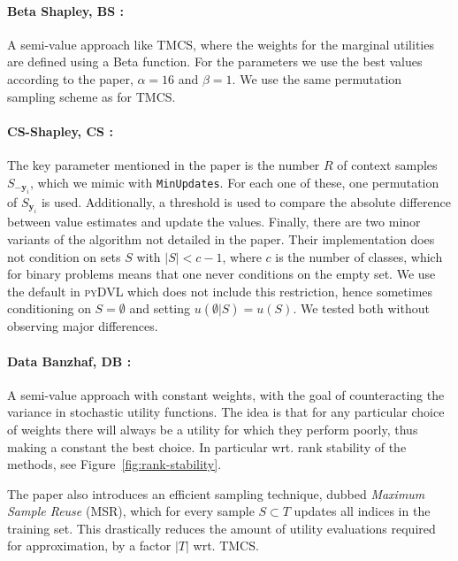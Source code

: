 \documentclass[10pt]{article}
\newcommand{\tmem}[1]{{\em #1\/}}
\newcommand{\tmmathbf}[1]{\ensuremath{\boldsymbol{#1}}}
\newcommand{\tmname}[1]{\textsc{#1}}
\newcommand{\python}[1]{\texttt{#1}}
\begin{document}
\paragraph{Beta Shapley, BS {\citep{kwon_beta_2022}}:}A semi-value approach
like TMCS, where the weights for the marginal utilities are defined using a
Beta function. For the parameters we use the best values according to the
paper, $\alpha = 16$ and $\beta = 1$. We use the same permutation sampling
scheme as for TMCS.

\paragraph{CS-Shapley, CS {\citep{schoch_csshapley_2022}}:}The key parameter
mentioned in the paper is the number $R$ of context samples
$S_{-\tmmathbf{y}_i}$, which we mimic with {\small{{\python{MinUpdates}}}}.
For each one of these, one permutation of $S_{\tmmathbf{y}_i}$ is used.
Additionally, a threshold is used to compare the absolute difference between
value estimates and update the values. Finally, there are two minor variants
of the algorithm not detailed in the paper. Their implementation does not
condition on sets $S$ with $| S | < c - 1$, where $c$ is the number of
classes, which for binary problems means that one never conditions on the
empty set. We use the default in {\tmname{pyDVL}} which does not include this
restriction, hence sometimes conditioning on $S = \emptyset$ and setting $u
(\emptyset |S) = u (S)$. We tested both without observing major differences.

\paragraph{Data Banzhaf, DB {\citep{wang_data_2022}}:}A semi-value approach
with constant weights, with the goal of counteracting the variance in
stochastic utility functions. The idea is that for any particular choice of
weights there will always be a utility for which they perform poorly, thus
making a constant the best choice. In particular wrt. rank stability of the
methods, see  Figure~\ref{fig:rank-stability}.

The paper also introduces an efficient sampling technique, dubbed
{\tmem{Maximum Sample Reuse}} (MSR), which for every sample $S \subset T$
updates all indices in the training set. This drastically reduces the amount
of utility evaluations required for approximation, by a factor $| T |$ wrt.
TMCS.
\end{document}
